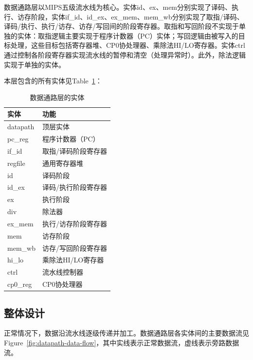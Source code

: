 \documentclass{article}
\begin{document}
\begin{spacing}{1.4}
数据通路层以MIPS五级流水线为核心。实体id、ex、mem分别实现了译码、执行、访存阶段，实体if\_id、id\_ex、ex\_mem、mem\_wb分别实现了取指/译码、译码/执行、执行/访存、访存/写回间的阶段寄存器。取指和写回阶段不实现于单独的实体：取指逻辑主要实现于程序计数器（PC）实体；写回逻辑由被写入的目标处理，这些目标包括寄存器堆、CP0协处理器、乘除法HI/LO寄存器。实体ctrl通过控制各阶段寄存器实现流水线的暂停和清空（处理异常时）。此外，除法逻辑实现于单独的实体。

本层包含的所有实体见Table~\ref{tb:datapath-entities}：

\begin{table}[!htb]
\begin{center}
\begin{tabular}{p{7.5cm}|p{7.5cm}}  
\hline  
\textbf{实体}&\textbf{功能} \\
\hline datapath & 顶层实体 \\
\hline pc\_reg & 程序计数器（PC） \\
\hline if\_id & 取指/译码阶段寄存器 \\
\hline regfile & 通用寄存器堆 \\
\hline id & 译码阶段 \\
\hline id\_ex & 译码/执行阶段寄存器 \\
\hline ex & 执行阶段 \\
\hline div & 除法器 \\
\hline ex\_mem & 执行/访存阶段寄存器 \\
\hline mem & 访存阶段 \\
\hline mem\_wb & 访存/写回阶段寄存器 \\
\hline hi\_lo & 乘除法HI/LO寄存器 \\
\hline ctrl & 流水线控制器 \\
\hline cp0\_reg & CP0协处理器 \\
\hline 
\end{tabular}  
\caption{数据通路层的实体}
\label{tb:datapath-entities}
\end{center}
\end{table}

\subsection{整体设计}

正常情况下，数据沿流水线逐级传递并加工。数据通路层各实体间的主要数据流见Figure~\ref{fig:datapath-data-flow}，其中实线表示正常数据流，虚线表示旁路数据流。


\end{spacing}
\end{document}
